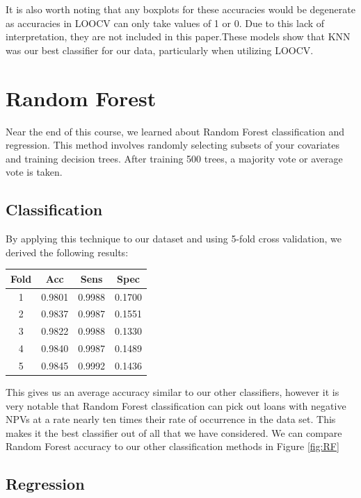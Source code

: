 \documentclass[10pt,twocolumn,letterpaper]{article}
\begin{document}
It is also worth noting that any boxplots for these accuracies would be degenerate as accuracies in LOOCV can only take values of 1 or 0. Due to this lack of interpretation, they are not included in this paper.These models show that KNN was our best classifier for our data, particularly when utilizing LOOCV. 

\section{Random Forest}
Near the end of this course, we learned about Random Forest classification and regression. This method involves randomly selecting subsets of your covariates and training decision trees. After training 500 trees, a majority vote or average vote is taken.

\subsection{Classification}
 By applying this technique to our dataset and using 5-fold cross validation, we derived the following results:
 
\begin{center}
	\begin{tabular}{ |c|c|c|c| } 
		\hline
		Fold & Acc & Sens & Spec   \\ 
		\hline
		1 & 0.9801 & 0.9988 & 0.1700 \\
		\hline
		2 & 0.9837 & 0.9987 & 0.1551 \\ 
		\hline
		3 & 0.9822 & 0.9988 & 0.1330 \\ 
		\hline
		4 & 0.9840 & 0.9987 & 0.1489 \\ 
		\hline
		5 & 0.9845 & 0.9992 & 0.1436 \\ 
		\hline
		
	\end{tabular}
\end{center}

This gives us an average accuracy similar to our other classifiers, however it is very notable that Random Forest classification can pick out loans with negative NPVs at a rate nearly ten times their rate of occurrence in the data set. This makes it the best classifier out of all that we have considered. We can compare Random Forest accuracy to our other classification methods in Figure \ref{fig:RF}

\subsection{Regression}
\end{document}
